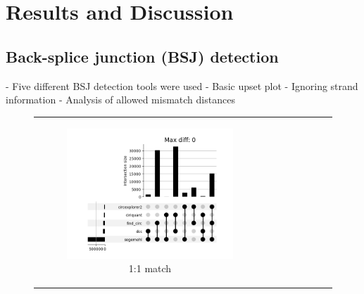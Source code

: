 \chapter{Results and Discussion}

\section{Back-splice junction (BSJ) detection}

- Five different BSJ detection tools were used
- Basic upset plot
- Ignoring strand information
- Analysis of allowed mismatch distances

\begin{figure}[ht]
    \begin{tabular}{cc}
        \begin{subfigure}{.5\textwidth}
            \centering

            \includegraphics[width=.8\linewidth]{chapters/4_results_and_discussion/figures/detection/min_samples_0/upset/diff_0.png}
            \caption{1:1 match}
            \label{fig:detection_upset_full}
        \end{subfigure}
         &
        \begin{subfigure}{.5\textwidth}
            \centering


\end{subfigure}
\end{tabular}
\end{figure}

